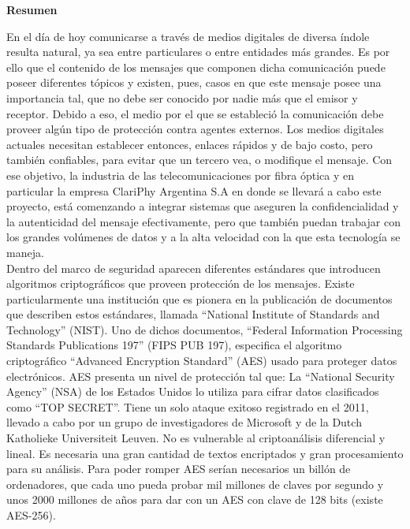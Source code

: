 \newenvironment{abstract}{
	\thispagestyle{empty}\vfill\begin{center}
	\bfseries Resumen\end{center}}
    {\vfill}
    \begin{abstract}
    
	En el día de hoy comunicarse a través de medios digitales de diversa índole resulta natural, ya sea entre particulares o entre entidades más grandes. Es por ello que el contenido de los mensajes que componen dicha comunicación puede poseer diferentes tópicos y existen, pues, casos en que este mensaje posee una importancia tal, que no debe ser conocido por nadie más que el emisor y receptor. Debido a eso, el medio por el que se estableció la comunicación debe proveer algún tipo de protección contra agentes externos. Los medios digitales actuales necesitan establecer entonces, enlaces rápidos y de bajo costo, pero también confiables, para evitar que un tercero vea, o modifique el mensaje. Con ese objetivo, la industria de las telecomunicaciones por fibra óptica y en particular la empresa ClariPhy Argentina S.A en donde se llevará a cabo este proyecto, está comenzando a integrar sistemas que aseguren la confidencialidad y la autenticidad del mensaje efectivamente, pero que también puedan trabajar con los grandes volúmenes de datos y a la alta velocidad con la que esta tecnología se maneja.\\

	Dentro del marco de seguridad aparecen diferentes estándares que introducen algoritmos criptográficos que proveen protección de los mensajes. Existe particularmente una institución que es pionera en la publicación de documentos que describen estos estándares, llamada “National Institute of Standards and Technology” (NIST). Uno de dichos documentos, “Federal Information Processing Standards Publications 197” (FIPS PUB 197), especifica el algoritmo criptográfico “Advanced Encryption Standard” (AES) usado para proteger datos electrónicos. 
AES presenta un nivel de protección tal que:
La “National Security Agency” (NSA) de los Estados Unidos lo utiliza para cifrar datos clasificados como “TOP SECRET”.
Tiene un solo ataque exitoso registrado en el 2011, llevado a cabo por un grupo de investigadores de Microsoft y de la Dutch Katholieke Universiteit Leuven.
No es vulnerable al criptoanálisis diferencial y lineal.
Es necesaria una gran cantidad de textos encriptados y gran procesamiento para su análisis.
Para poder romper AES serían necesarios un billón de ordenadores, que cada uno pueda probar mil millones de claves por segundo y unos 2000 millones de años para dar con un AES con clave de 128 bits (existe AES-256).\\


\end{abstract}
